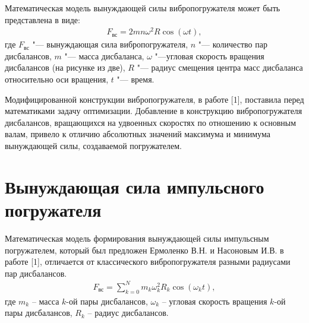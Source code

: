 Математическая модель вынуждающей силы вибропогружателя может быть представлена в виде:
\begin{equation}\label{eq:centrifugal}
    \begin{gathered}
        F_{\textrm{вс}} = 2mn\omega^2 R\cos(\omega t),
    \end{gathered}
\end{equation}
\noindent где $F_{\textrm{вс}}$ "--- вынуждающая сила вибропогружателя, $n$ "--- количество пар дисбалансов, $m$ "--- масса дисбаланса, $\omega$ "---угловая скорость вращения дисбалансов (на рисунке из две),
$R$ "--- радиус смещения центра масс дисбаланса относительно оси вращения, $t$ "--- время.

Модифицированной конструкции вибропогружателя,  в работе [1], поставила перед математиками задачу оптимизации.
Добавление в конструкцию вибропогружателя дисбалансов, вращающихся на удвоенных скоростях по отношению к основным валам, привело к отличию абсолютных
значений максимума и минимума вынуждающей силы, создаваемой погружателем.

\section{Вынуждающая сила импульсного погружателя}
Математическая модель формирования вынуждающей силы импульсным погружателем, который был предложен Ермоленко В.Н. и Насоновым И.В. в работе [1], отличается от классического вибропогружателя разными радиусами пар дисбалансов.
\begin{equation}\label{eq:short_harmonic_sum}
    \begin{gathered}
        F_{\textrm{вс}} = \sum\limits_{k = 0}^N m_k \omega_k^2 R_k \cos(\omega_k t),
    \end{gathered}
\end{equation}
\noindent где $m_k$ – масса $k$-ой пары дисбалансов, $\omega_k$ – угловая скорость вращения $k$-ой пары дисбалансов, $R_k$ – радиус дисбалансов.

